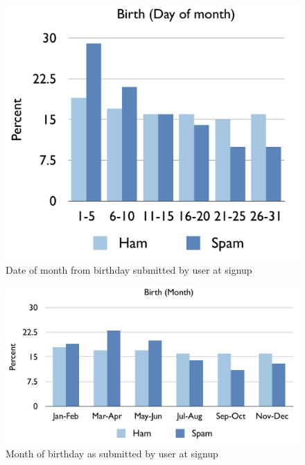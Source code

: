 \documentclass[preprint]{acm_proc_article-sp}
\begin{document}
\begin{figure}[h]
    \centering
    \includegraphics[width=\linewidth]{figures/dob-day.pdf}
    \caption{Date of month from birthday submitted by user at signup}
    \label{fig:day}
\end{figure}

\begin{figure}[h]
    \centering
    \includegraphics[width=\linewidth]{figures/dob-month.pdf}
    \caption{Month of birthday as submitted by user at signup}
    \label{fig:month}
\end{figure}
\end{document}
